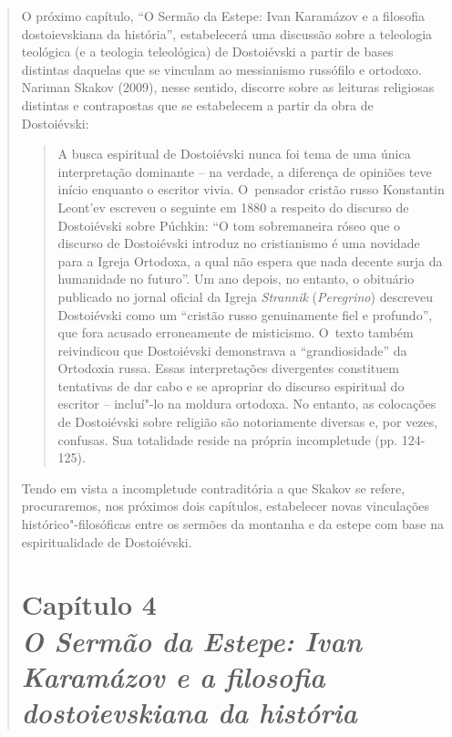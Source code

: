 {\begin{quote}
O próximo capítulo, ``O Sermão da Estepe: Ivan Karamázov e a filosofia
dostoievskiana da história'', estabelecerá uma discussão sobre a
teleologia teológica (e a teologia teleológica) de Dostoiévski a partir
de bases distintas daquelas que se vinculam ao messianismo russófilo e
ortodoxo. Nariman Skakov (2009), nesse sentido, discorre sobre as
leituras religiosas distintas e contrapostas que se estabelecem a partir
da obra de Dostoiévski:

\begin{quote}
A busca espiritual de Dostoiévski nunca foi tema de uma única
interpretação dominante -- na verdade, a diferença de opiniões teve
início enquanto o escritor vivia. O~pensador cristão russo Konstantin
Leont'ev escreveu o seguinte em 1880 a respeito do discurso de
Dostoiévski sobre Púchkin: ``O tom sobremaneira róseo que o discurso de
Dostoiévski introduz no cristianismo é uma novidade para a Igreja
Ortodoxa, a qual não espera que nada decente surja da humanidade no
futuro''. Um ano depois, no entanto, o obituário publicado no jornal
oficial da Igreja \emph{Strannik} (\emph{Peregrino}) descreveu
Dostoiévski como um ``cristão russo genuinamente fiel e profundo'', que
fora acusado erroneamente de misticismo. O~texto também reivindicou que
Dostoiévski demonstrava a ``grandiosidade'' da Ortodoxia russa. Essas
interpretações divergentes constituem tentativas de dar cabo e se
apropriar do discurso espiritual do escritor -- incluí"-lo na moldura
ortodoxa. No entanto, as colocações de Dostoiévski sobre religião são
notoriamente diversas e, por vezes, confusas. Sua totalidade reside na
própria incompletude (pp. 124-125).
\end{quote}

Tendo em vista a incompletude contraditória a que Skakov se refere,
procuraremos, nos próximos dois capítulos, estabelecer novas vinculações
histórico"-filosóficas entre os sermões da montanha e da estepe com base
na espiritualidade de Dostoiévski.

\chapter*{Capítulo 4\\
\bigskip
\emph{O Sermão da Estepe: Ivan Karamázov e a filosofia dostoievskiana da
história}}



\end{quote}}
